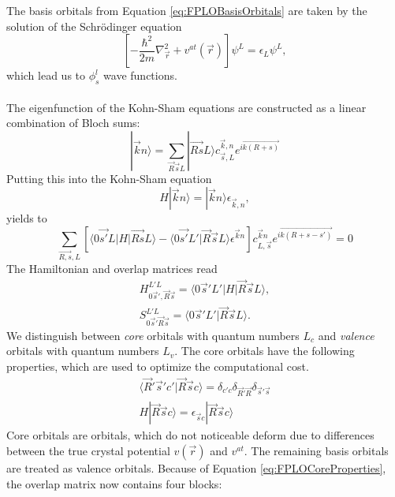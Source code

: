 			The basis orbitals from Equation \ref{eq:FPLOBasisOrbitals} are taken by the solution of the Schrödinger equation 
			\begin{equation}
				\left[ - \frac{\hbar^2}{2m} \nabla_{\vec r}^2 + v^{at}(\vec r )  \right] \psi^L = \epsilon_L \psi^L,
			\end{equation} 
			which lead us to $\phi_s^l$ wave functions. \\\\
			The eigenfunction of the Kohn-Sham equations are constructed as a linear combination of Bloch sums:
			\begin{equation}
				| \vec k n \rangle = \sum_{\vec R \vec s L} | \vec{Rs} L \rangle c_{\vec s,L}^{\vec k,n} e^{i \vec {k(R+s)}}
			\end{equation}
			Putting this into the Kohn-Sham equation
			\begin{equation}
				H|\vec kn \rangle = | \vec k n \rangle \epsilon_{\vec k, n},
			\end{equation}
			yields to 
			\begin{equation}
				\sum_{\vec{R, s}, L} \left[ \langle 0 \vec{s'} L | H | \vec{Rs}L \rangle - \langle 0 \vec{s'} L' | \vec R \vec s L \rangle \epsilon^{\vec k n} \right] c_{L, \vec s}^{\vec k n} e^{i \vec{k(R+s-s')}} = 0
			\end{equation}
			The Hamiltonian and overlap matrices read
			\begin{align}
				H_{0 \vec s', \vec R \vec s}^{L'L} = \langle 0 \vec s'L'| H | \vec R \vec s L \rangle, \\
				S_{0 \vec s' \vec R \vec s}^{L'L} = \langle 0 \vec s'L'| \vec R \vec s L \rangle.
			\end{align} 
			We distinguish between \textit{core} orbitals with quantum numbers $L_c$ and \textit{valence} orbitals with quantum numbers $L_v$. The core orbitals have the following properties, which are used to optimize the computational cost.
			\begin{align}
				\label{eq:FPLOCoreProperties}
				\langle \vec R' \vec s' c' | \vec R \vec s c \rangle = \delta_{c' c} \delta_{\vec R' \vec R } \delta_{\vec s'\vec s} \\
				H | \vec R \vec s c \rangle = \epsilon_{\vec s c} | \vec R \vec s c \rangle 
			\end{align} 
			Core orbitals are orbitals, which do not noticeable deform due to differences between the true crystal potential $v(\vec r)$ and $v^{at}$. The remaining basis orbitals are treated as valence orbitals. Because of Equation \ref{eq:FPLOCoreProperties}, the overlap matrix now contains four blocks:
